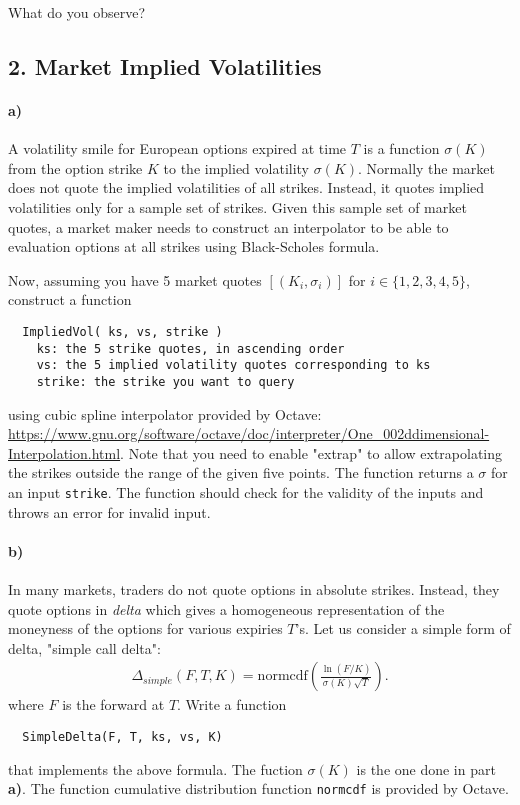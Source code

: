 \documentclass[12pt,a4paper,hidelinks,fleqn]{article}            %
\begin{document}
What do you observe?
 
\subsection*{2. Market Implied Volatilities}

\paragraph{a)} A volatility smile for European options expired at time $T$ is a function $\sigma(K)$ from the option strike $K$ to the implied volatility $\sigma(K)$.
Normally the market does not quote the implied volatilities of all strikes.
Instead, it quotes implied volatilities only for a sample set of strikes. 
Given this sample set of market quotes, 
a market maker needs to construct an interpolator to be able to evaluation options at all strikes using Black-Scholes formula.

Now, assuming you have 5 market quotes $[(K_i, \sigma_i)]$ for $i\in\{1, 2, 3, 4, 5\}$,
construct a function 
\vspace{-0.6cm}
\begin{verbatim}
  ImpliedVol( ks, vs, strike )
    ks: the 5 strike quotes, in ascending order
    vs: the 5 implied volatility quotes corresponding to ks
    strike: the strike you want to query
\end{verbatim}
\vspace{-0.6cm}
using cubic spline interpolator provided by Octave:
\url{https://www.gnu.org/software/octave/doc/interpreter/One_002ddimensional-Interpolation.html}.
Note that you need to enable "extrap" to allow extrapolating the strikes outside the range of the given five points.
The function returns a $\sigma$ for an input \verb=strike=.
The function should check for the validity of the inputs and throws an error for invalid input.

\paragraph{b)}
In many markets, traders do not quote options in absolute strikes. 
Instead, they quote options in \emph{delta} which gives a homogeneous representation of the moneyness of the options for various expiries $T$'s.
Let us consider a simple form of delta, "simple call delta":
\begin{align*}
\Delta_{simple} (F, T, K) = \text{normcdf}\left( \frac{\ln(F/K)}{\sigma(K) \sqrt T} \right).
\end{align*}
where $F$ is the forward at $T$. 
Write a function 
\vspace{-6mm}
\begin{verbatim}
  SimpleDelta(F, T, ks, vs, K)
\end{verbatim}
\vspace{-6mm}
that implements the above formula. The fuction $\sigma(K)$ is the one done in part \textbf{a)}. 
The function cumulative distribution function \verb=normcdf= is provided by Octave.
 
\end{document}
